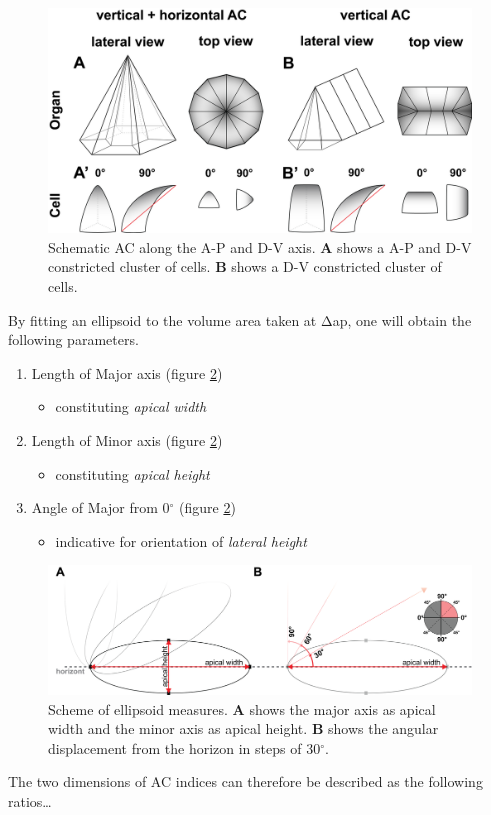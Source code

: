 \documentclass[11pt,singlespacinge,twoside]{reedthesis} %
\providecommand{\tightlist}{%
  \setlength{\itemsep}{0pt}\setlength{\parskip}{0pt}}
\begin{document}
\begin{figure}

{\centering \includegraphics[width=0.75\linewidth]{figures/materials/models/ACI_Cells_pol} 

}

\caption[Schematic anisotropic AC]{Schematic AC along the A-P and D-V axis. \textbf{A} shows a A-P and D-V constricted cluster of cells. \textbf{B} shows a D-V constricted cluster of cells.}\label{fig:cellpol}
\end{figure}
\noindent By fitting an ellipsoid to the volume area taken at \(\mathrm{\Delta}\)ap, one will obtain the following parameters.
\begin{enumerate}
\def\labelenumi{\arabic{enumi}.}
\tightlist
\item
  Length of Major axis (figure \ref{fig:ellipse})
  \begin{itemize}
  \tightlist
  \item
    constituting \emph{apical width}
  \end{itemize}
\item
  Length of Minor axis (figure \ref{fig:ellipse})
  \begin{itemize}
  \tightlist
  \item
    constituting \emph{apical height}
  \end{itemize}
\item
  Angle of Major from 0\(^\circ\) (figure \ref{fig:ellipse})
  \begin{itemize}
  \tightlist
  \item
    indicative for orientation of \emph{lateral height}
  \end{itemize}
\end{enumerate}

\begin{figure}

{\centering \includegraphics[width=0.75\linewidth]{figures/materials/models/ellipse} 

}

\caption[Scheme of ellipsoid measures]{Scheme of ellipsoid measures. \textbf{A} shows the major axis as apical width and the minor axis as apical height. \textbf{B} shows the angular displacement from the horizon in steps of 30\(^\circ\).}\label{fig:ellipse}
\end{figure}
The two dimensions of AC indices can therefore be described as the following ratios\ldots{}
\end{document}
